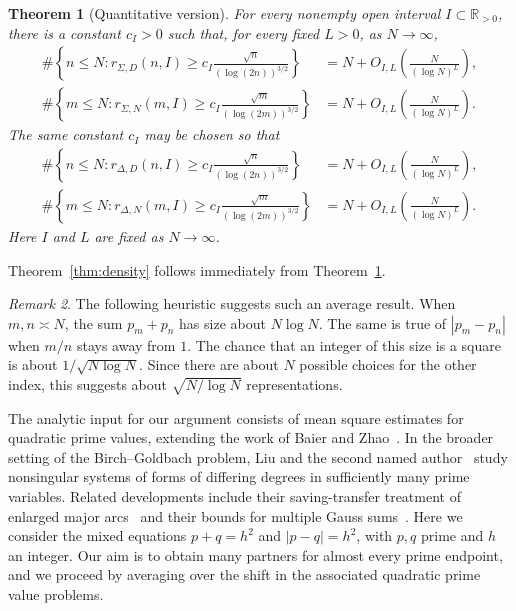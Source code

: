 \documentclass[12pt,reqno]{amsart}
\numberwithin{equation}{section}
\theoremstyle{plain}
\newtheorem{theorem}{Theorem}[section]
\theoremstyle{remark}
\newtheorem{remark}[theorem]{Remark}
\begin{document}
\begin{theorem}[Quantitative version]\label{thm:main}
For every nonempty open interval $I\subset\mathbb R_{>0}$,
there is a constant $c_I>0$ such that, for every fixed $L>0$,
as $N\to\infty$,
\begin{align}
 \#\left\{n\leq N:r_{\Sigma,D}(n,I)\geq
 c_I\frac{\sqrt n}{(\log(2n))^{3/2}}\right\}
 &=N+O_{I,L}\left(\frac{N}{(\log N)^L}\right),
 \label{sum-many-D}\\
 \#\left\{m\leq N:r_{\Sigma,N}(m,I)\geq
 c_I\frac{\sqrt m}{(\log(2m))^{3/2}}\right\}
 &=N+O_{I,L}\left(\frac{N}{(\log N)^L}\right).
 \label{sum-many-N}
\end{align}
The same constant $c_I$ may be chosen so that
\begin{align}
 \#\left\{n\leq N:r_{\Delta,D}(n,I)\geq
 c_I\frac{\sqrt n}{(\log(2n))^{3/2}}\right\}
 &=N+O_{I,L}\left(\frac{N}{(\log N)^L}\right),
 \label{difference-many-D}\\
 \#\left\{m\leq N:r_{\Delta,N}(m,I)\geq
 c_I\frac{\sqrt m}{(\log(2m))^{3/2}}\right\}
 &=N+O_{I,L}\left(\frac{N}{(\log N)^L}\right).
 \label{difference-many-N}
\end{align}
Here $I$ and $L$ are fixed as $N\to\infty$.
\end{theorem}

Theorem~\ref{thm:density}  follows immediately from
Theorem~\ref{thm:main}.



\begin{remark}
The following heuristic suggests such an average result.
When $m,n\asymp N$, the sum $p_m+p_n$ has size about $N\log N$.
The same is true of $|p_m-p_n|$ when $m/n$ stays away from $1$.
The chance that an integer of this size is a square is about $1/\sqrt{N\log N}$.
Since there are about $N$ possible choices for the other index, this suggests about $\sqrt{N/\log N}$ representations.
\end{remark}

The analytic input for our argument consists of mean square
estimates for quadratic prime values, extending the work of
Baier and Zhao~\cite{BaierZhao2007}.
In the broader setting of the Birch--Goldbach problem, Liu and
the second named author~\cite{LiuXieForms} study nonsingular systems of forms of
differing degrees in sufficiently many prime variables.
Related developments include their saving-transfer treatment
of enlarged major arcs~\cite{LiuXieSavingTransfer} and their
bounds for multiple Gauss sums~\cite{LiuXieGauss}.
Here we consider the mixed equations $p+q=h^2$ and $|p-q|=h^2$,
with $p,q$ prime and $h$ an integer.
Our aim is to obtain many partners for almost every prime
endpoint, and we proceed by averaging over the shift in the
associated quadratic prime value problems.
\end{document}

